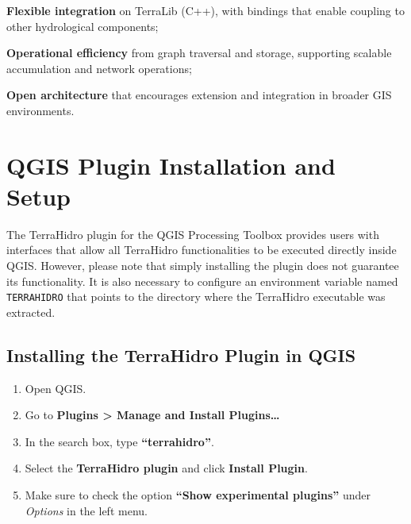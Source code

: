 \documentclass[
]{book}
\providecommand{\tightlist}{%
  \setlength{\itemsep}{0pt}\setlength{\parskip}{0pt}}
\theoremstyle{definition}
\theoremstyle{definition}
\theoremstyle{definition}
\theoremstyle{definition}
\theoremstyle{remark}
\begin{document}
\textbf{Flexible integration} on TerraLib (C++), with bindings that enable coupling to other hydrological components;

\textbf{Operational efficiency} from graph traversal and storage, supporting scalable accumulation and network operations;

\textbf{Open architecture} that encourages extension and integration in broader GIS environments.

\section*{QGIS Plugin Installation and Setup}\label{qgis-plugin-installation-and-setup}

The TerraHidro plugin for the QGIS Processing Toolbox provides users with interfaces that allow all TerraHidro functionalities to be executed directly inside QGIS. However, please note that simply installing the plugin does not guarantee its functionality. It is also necessary to configure an environment variable named \texttt{TERRAHIDRO} that points to the directory where the TerraHidro executable was extracted.

\subsection*{Installing the TerraHidro Plugin in QGIS}\label{installing-the-terrahidro-plugin-in-qgis}

\begin{enumerate}
\def\labelenumi{\arabic{enumi}.}
\tightlist
\item
  Open QGIS.\\
\item
  Go to \textbf{Plugins \textgreater{} Manage and Install Plugins\ldots{}}\\
\item
  In the search box, type \textbf{``terrahidro''}.\\
\item
  Select the \textbf{TerraHidro plugin} and click \textbf{Install Plugin}.\\
\item
  Make sure to check the option \textbf{``Show experimental plugins''} under \emph{Options} in the left menu.
\end{enumerate}
\end{document}
